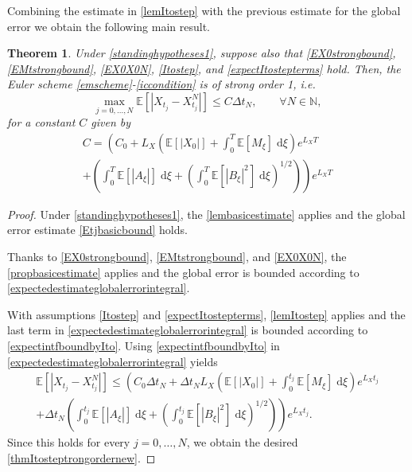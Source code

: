 \documentclass[reqno,12pt]{amsart}
\theoremstyle{plain}%
\newtheorem{thm}{Theorem}[section]
\theoremstyle{definition}
\begin{document}
Combining the estimate in \cref{lemItostep} with the previous estimate for the global error we obtain the following main result.
\begin{thm}
    \label{thmItostep}
    Under \cref{standinghypotheses1}, suppose also that
    \eqref{EX0strongbound}, \eqref{EMtstrongbound}, \eqref{EX0X0N}, \eqref{Itostep}, and \eqref{expectItostepterms} hold. Then, the Euler scheme \eqref{emscheme}-\eqref{iccondition} is of strong order 1, i.e.
    \begin{equation}
      \label{thmItosteptrongordernew}
        \max_{j=0, \ldots, N}\mathbb{E}\left[ \left| X_{t_j} - X_{t_j}^N \right| \right] \leq C \Delta t_N, \qquad \forall N \in \mathbb{N},
    \end{equation}
    for a constant $C$ given by
    \begin{multline}
        \label{constItostepboundstrongordernew}
        C = \left( C_0 +  L_X \left(\mathbb{E}[|X_0|] + \int_0^T \mathbb{E}[M_\xi]\;\mathrm{d}\xi\right)e^{L_X T}\right. \\
        \left. + \left(\int_0^T \mathbb{E}[|A_\xi|] \;\mathrm{d}\xi + \left(\int_0^T \mathbb{E}[|B_\xi|^2] \;\mathrm{d}\xi \right)^{1/2}\right)\right) e^{L_X T}
    \end{multline}
\end{thm}

\begin{proof}
    Under \cref{standinghypotheses1}, the \cref{lembasicestimate} applies and the global error estimate \eqref{Etjbasicbound} holds.
    
    Thanks to \eqref{EX0strongbound}, \eqref{EMtstrongbound}, and \eqref{EX0X0N}, the \cref{propbasicestimate} applies and the global error is bounded according to \eqref{expectedestimateglobalerrorintegral}.
    
    With assumptions \eqref{Itostep} and \eqref{expectItostepterms}, \cref{lemItostep} applies and the last term in \eqref{expectedestimateglobalerrorintegral} is bounded according to \eqref{expectintfboundbyIto}. Using \eqref{expectintfboundbyIto} in \eqref{expectedestimateglobalerrorintegral} yields
    \begin{multline*}
        \mathbb{E} \left[|X_{t_j} - X_{t_j}^N|\right] \leq \left( C_0 \Delta t_N + \Delta t_N L_X \left(\mathbb{E}[|X_0|] + \int_0^{t_j} \mathbb{E}[M_\xi]\;\mathrm{d}\xi\right)e^{L_X t_j}\right. \\
        \left. + \Delta t_N \left(\int_0^{t_j} \mathbb{E}[|A_\xi|] \;\mathrm{d}\xi + \left(\int_0^{t_j} \mathbb{E}[|B_\xi|^2] \;\mathrm{d}\xi \right)^{1/2}\right)\right) e^{L_X t_j}.
    \end{multline*}
    Since this holds for every $j=0, \ldots, N$, we obtain the desired \eqref{thmItosteptrongordernew}.
\end{proof}
\end{document}
